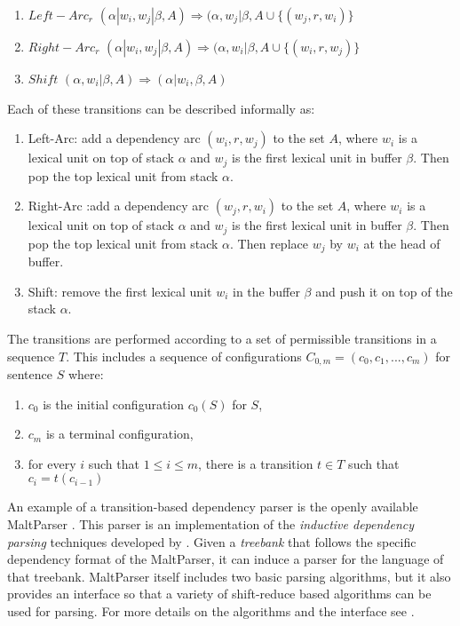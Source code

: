 \begin{enumerate}
\item $Left-Arc_r$ \hspace{10mm} $(\alpha|w_i, w_j|\beta, A) \Rightarrow (\alpha, w_j|\beta, A \cup \{(w_j, r, w_i)\}$
\item $Right-Arc_r$ \hspace{8mm} $(\alpha|w_i, w_j|\beta, A) \Rightarrow (\alpha, w_i|\beta, A \cup \{(w_i, r, w_j)\}$
\item $Shift$ \hspace{22mm} $(\alpha, w_i|\beta, A) \Rightarrow (\alpha|w_i,\beta, A)$
\end{enumerate}

Each of these transitions can be described informally as:

\begin{enumerate}
\item Left-Arc: add a dependency arc $(w_i, r, w_j)$ to the set $A$, where $w_i$ is a lexical unit on top of stack $\alpha$ and $w_j$ is the first lexical unit in buffer $\beta$. Then pop the top lexical unit from stack $\alpha$.
\item Right-Arc :add a dependency arc $(w_j, r, w_i)$ to the set $A$, where $w_i$ is a lexical unit on top of stack $\alpha$ and $w_j$ is the first lexical unit in buffer $\beta$. Then pop the top lexical unit from stack $\alpha$. Then replace $w_j$ by $w_i$ at the head of buffer. 
\item Shift: remove the first lexical unit $w_i$ in the buffer $\beta$ and push it on top of the stack $\alpha$. 
\end{enumerate}

The transitions are performed according to a set of permissible transitions in a sequence $T$. This includes a sequence of configurations $C_{0,m} = (c_0, c_1, ..., c_m)$ for sentence $S$ where:

\begin{enumerate}
\item $c_0$ is the initial configuration $c_0(S)$ for $S$,
\item $c_m$ is a terminal configuration,
\item for every $i$ such that $1 \leq i \leq m$, there is a transition $t \in T$ such that $c_i = t(c_{i-1})$
\end{enumerate}

An example of a transition-based dependency parser is the openly available MaltParser \cite{Niv:Hal:Nil:07}. This parser is an implementation of the \textit{inductive dependency parsing} techniques developed by . Given a \textit{treebank} that follows the specific dependency format of the MaltParser, it can induce a parser for the language of that treebank. MaltParser itself includes two basic parsing algorithms, but it also provides an interface so that a variety of shift-reduce based algorithms can be used for parsing. For more details on the algorithms and the interface see .

